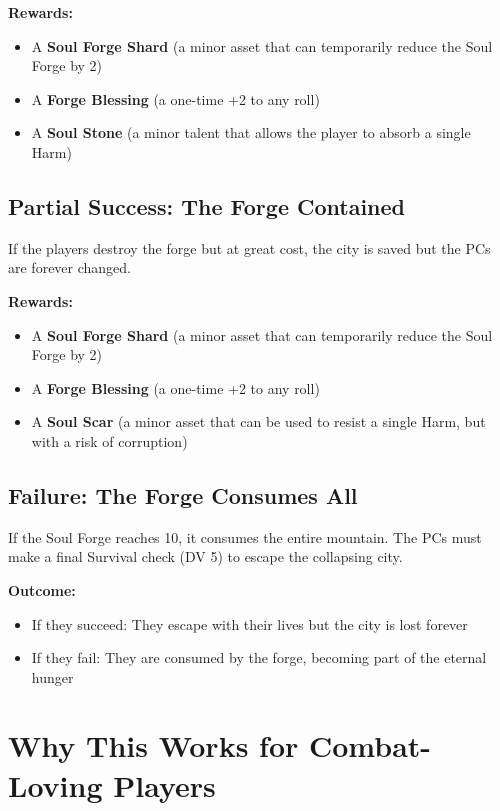\documentclass[11pt]{article}
\begin{document}
\textbf{Rewards:}
\begin{itemize}
    \item A \textbf{Soul Forge Shard} (a minor asset that can temporarily reduce the Soul Forge by 2)
    \item A \textbf{Forge Blessing} (a one-time +2 to any roll)
    \item A \textbf{Soul Stone} (a minor talent that allows the player to absorb a single Harm)
\end{itemize}

\subsection{Partial Success: The Forge Contained}

If the players destroy the forge but at great cost, the city is saved but the PCs are forever changed.

\textbf{Rewards:}
\begin{itemize}
    \item A \textbf{Soul Forge Shard} (a minor asset that can temporarily reduce the Soul Forge by 2)
    \item A \textbf{Forge Blessing} (a one-time +2 to any roll)
    \item A \textbf{Soul Scar} (a minor asset that can be used to resist a single Harm, but with a risk of corruption)
\end{itemize}

\subsection{Failure: The Forge Consumes All}

If the Soul Forge reaches 10, it consumes the entire mountain. The PCs must make a final Survival check (DV 5) to escape the collapsing city.

\textbf{Outcome:}
\begin{itemize}
    \item If they succeed: They escape with their lives but the city is lost forever
    \item If they fail: They are consumed by the forge, becoming part of the eternal hunger
\end{itemize}

\section{Why This Works for Combat-Loving Players}
\end{document}
